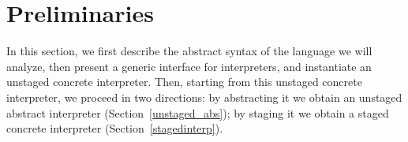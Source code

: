 \newcommand{\TLang}{$L_\lambda$}

\section{Preliminaries}

In this section, we first describe the abstract syntax of the language we will analyze, then present a
generic interface for interpreters, and instantiate an unstaged concrete interpreter.
Then, starting from this unstaged concrete interpreter, we proceed in two directions:
by abstracting it we obtain an unstaged abstract interpreter (Section~\ref{unstaged_abs}); 
by staging it we obtain a staged concrete interpreter (Section~\ref{stagedinterp}).




